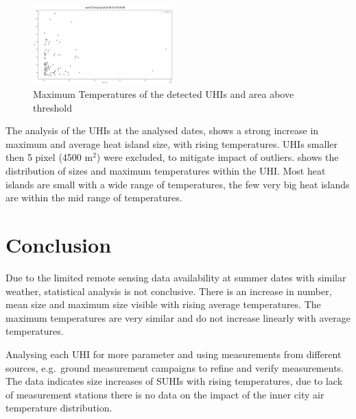 \documentclass[12pt,a4paper, english,twoside]{scrartcl}
\begin{document}
      \begin{figure}
        \vspace{-1cm}
         \begin{center}
         \includegraphics[width=0.48\textwidth]{img/sizeVsTempmax2019-06-29 00:00:00.png}
       \end{center}
       \caption{Maximum Temperatures of the detected \glspl{UHI} and area above threshold}\label{fig:tempvssize}
      \end{figure}
    
    The analysis of the \glspl{UHI} at the analysed dates, shows a strong increase in maximum and average heat island size, with rising temperatures. 
    \Glspl{UHI} smaller then 5 pixel (4500 m$^2$) were excluded, to mitigate impact of outliers. 
     shows the distribution of sizes and maximum temperatures within the \gls{UHI}.
    Most heat islands are small with a wide range of temperatures, the few very big heat islands are within the mid range of temperatures. 
    

     
\newpage
\section{Conclusion}\label{sec:conclusion}

    Due to the limited remote sensing data availability at summer dates with similar weather, statistical analysis is not conclusive. 
    There is an increase in number, mean size and maximum size visible with rising average temperatures. 
    The maximum temperatures are very similar and do not increase linearly with average temperatures. 

    
    Analysing each \gls{UHI} for more parameter and using measurements from different sources, e.g.\ ground measurement campaigns to refine and verify measurements.
    The data indicates size increases of \glspl{SUHI} with rising temperatures, due to lack of measurement stations there is no data on the impact of the inner city air temperature distribution.
\end{document}

